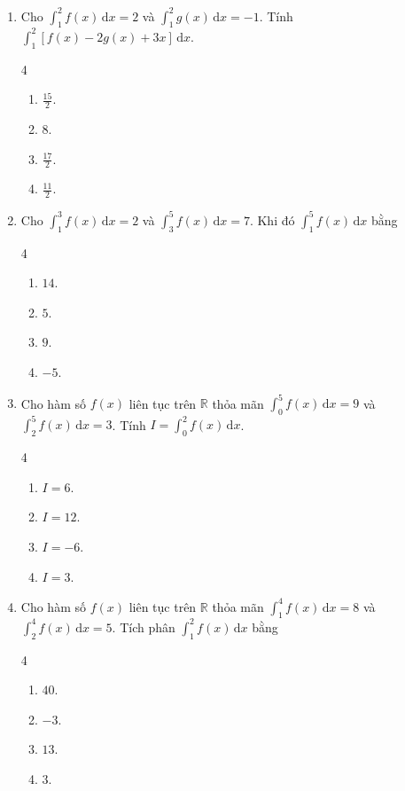 \documentclass[12pt]{article}
\begin{document}
\begin{enumerate}[label=\textbf{Câu \arabic*.}]
		\item Cho $\displaystyle \int_1^2 f(x)\,\mathrm{d}x = 2$ và $\displaystyle \int_1^2 g(x)\,\mathrm{d}x = -1$. Tính $\displaystyle \int_1^2 [f(x) - 2g(x) + 3x]\,\mathrm{d}x$.
		\begin{multicols}{4}
			\begin{enumerate}[label=\textbf{\Alph*.}]
				\item $\displaystyle \frac{15}{2}$.
				\item $8$.
				\item $\displaystyle \frac{17}{2}$.
				\item $\displaystyle \frac{11}{2}$.
			\end{enumerate}
		\end{multicols}
		
		\item Cho $\displaystyle \int_1^3 f(x)\,\mathrm{d}x = 2$ và $\displaystyle \int_3^5 f(x)\,\mathrm{d}x = 7$. Khi đó $\displaystyle \int_1^5 f(x)\,\mathrm{d}x$ bằng
		\begin{multicols}{4}
			\begin{enumerate}[label=\textbf{\Alph*.}]
				\item $14$.
				\item $5$.
				\item $9$.
				\item $-5$.
			\end{enumerate}
		\end{multicols}
		
		\item Cho hàm số $f(x)$ liên tục trên $\mathbb{R}$ thỏa mãn $\displaystyle \int_0^5 f(x)\,\mathrm{d}x = 9$ và $\displaystyle \int_2^5 f(x)\,\mathrm{d}x = 3$. Tính $I = \displaystyle \int_0^2 f(x)\,\mathrm{d}x$.
		\begin{multicols}{4}
			\begin{enumerate}[label=\textbf{\Alph*.}]
				\item $I = 6$.
				\item $I = 12$.
				\item $I = -6$.
				\item $I = 3$.
			\end{enumerate}
		\end{multicols}
		
		\item Cho hàm số $f(x)$ liên tục trên $\mathbb{R}$ thỏa mãn $\displaystyle \int_1^4 f(x)\,\mathrm{d}x = 8$ và $\displaystyle \int_2^4 f(x)\,\mathrm{d}x = 5$. Tích phân $\displaystyle \int_1^2 f(x)\,\mathrm{d}x$ bằng
		\begin{multicols}{4}
			\begin{enumerate}[label=\textbf{\Alph*.}]
				\item $40$.
				\item $-3$.
				\item $13$.
				\item $3$.
			\end{enumerate}
		\end{multicols}
		

\end{enumerate}
\end{document}
